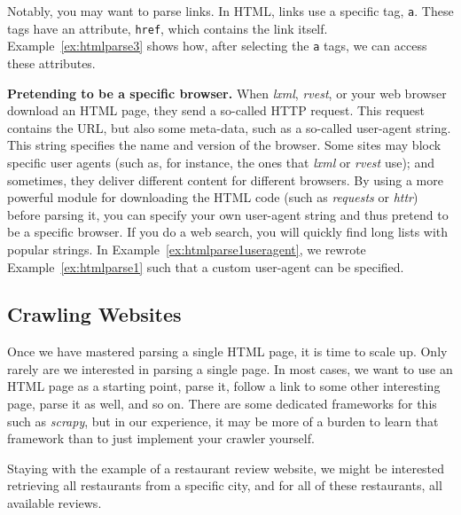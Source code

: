 Notably, you may want to parse links. In HTML, links use a specific tag, \verb|a|. These tags have an attribute, \verb|href|, which contains the link itself. Example~\ref{ex:htmlparse3} shows how, after selecting the \verb|a| tags, we can access these attributes.




\begin{feature}\textbf{Pretending to be a specific browser.}  When \emph{lxml}, \emph{rvest}, or your web browser download an HTML page, they send a so-called HTTP request. This request contains the URL, but also some meta-data, such as a so-called user-agent string. This string specifies the name and version of the browser. Some sites may block specific user agents (such as, for instance, the ones that \emph{lxml} or \emph{rvest} use); and sometimes, they deliver different content for different browsers. By using a more powerful module for downloading the HTML code (such as \emph{requests} or \emph{httr}) before parsing it, you can specify your own user-agent string and thus pretend to be a specific browser. If you do a web search, you will quickly find long lists with popular strings. In Example~\ref{ex:htmlparse1useragent}, we rewrote Example~\ref{ex:htmlparse1} such that a custom user-agent can be specified.
\end{feature}





\subsection{Crawling Websites}
\label{sec:crawling}

Once we have mastered parsing a single HTML page, it is time to scale
up. Only rarely are we interested in parsing a single page. In most
cases, we want to use an HTML page as a starting point, parse it,
follow a link to some other interesting page, parse it as well, and so
on. There are some dedicated frameworks for this such as \emph{scrapy},
but in our experience, it may be more of a burden to learn that
framework than to just implement your crawler yourself.

Staying with the example of a restaurant review website, we might be
interested retrieving all restaurants from a specific city, and for
all of these restaurants, all available reviews.

